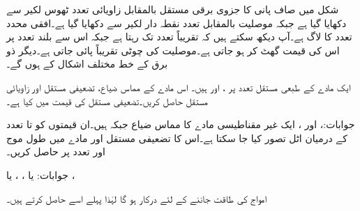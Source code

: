شکل  میں صاف پانی کا جزوی برقی مستقل  بالمقابل زاویائی تعدد  ٹھوس لکیر سے دکھایا گیا ہے جبکہ موصلیت بالمقابل تعدد نقطہ دار لکیر سے دکھایا گیا ہے۔افقی محدد تعدد کا لاگ ہے۔آپ دیکھ سکتے ہیں کہ تقریباً  تعدد تک  رہتا ہے جبکہ اس سے بلند تعدد پر اس کی قیمت گھٹ کر  ہو جاتی ہے۔موصلیت کی چوٹی تقریباً  پائی جاتی ہے۔دیگر ذو برق کے خط مختلف اشکال کے ہوں گے۔

ایک مادے  کے طبعی مستقل  تعدد پر  ،  اور  ہیں۔ اس مادے کے مماس ضیاع، تضعیفی مستقل اور زاویائی مستقل حاصل کریں۔تضعیفی مستقل کی قیمت  میں کیا ہے۔

جوابات:،  اور ، 
ایک غیر مقناطیسی مادے کا مماس ضیاع  جبکہ  ہیں۔ان قیمتوں کو  تا  تعدد کے درمیان اٹل تصور کیا جا سکتا ہے۔اس کا تضعیفی مستقل اور  مادے میں طول موج   اور  تعدد پر حاصل کریں۔

جوابات: یا ، ،  یا ،  

امواج کی طاقت جاننے کے لئے    درکار ہو گا لہٰذا پہلے اسے حاصل کرتے ہیں۔

